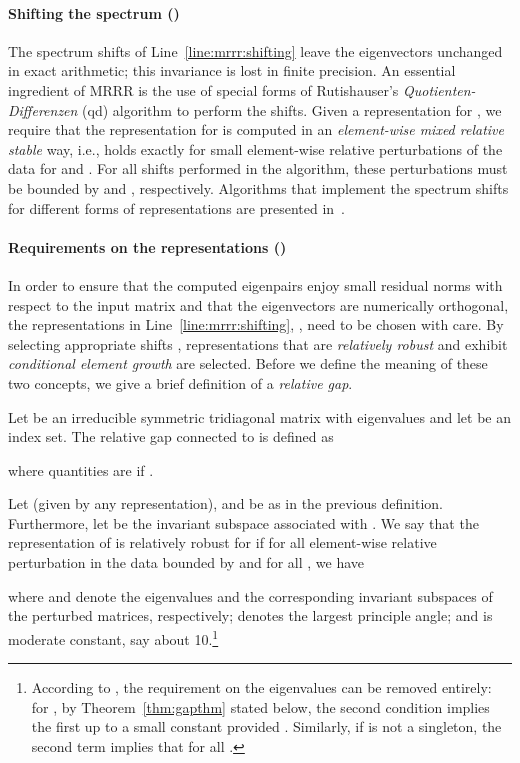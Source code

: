 \documentclass[final]{siamltex}
\begin{document}
\paragraph{Shifting the spectrum ()}
The spectrum shifts of Line~\ref{line:mrrr:shifting} leave the eigenvectors 
unchanged in exact arithmetic; this invariance is lost in finite precision. An essential
ingredient of MRRR is the use of special forms of Rutishauser's {\it
  Quotienten-Differenzen} (qd) algorithm to perform the shifts. 
Given a representation for , we require that the representation
for  is computed in an {\it element-wise mixed relative 
stable} way, i.e.,  holds
exactly for small element-wise relative perturbations of the data for
 and . For all shifts performed in the algorithm, these
perturbations must be bounded by   
 and , respectively. Algorithms that implement the spectrum
shifts for different forms of representations are presented
in~\cite{Dhillon:2004:Ortvecs,Willems:twisted,Willems:blocked}. 

\paragraph{Requirements on the representations ()}
In order to ensure that the computed eigenpairs enjoy small residual norms
with respect to the input matrix and that the eigenvectors are
numerically orthogonal, the representations in
Line~\ref{line:mrrr:shifting}, , need to be chosen
with care. By selecting appropriate shifts , representations that are
{\it relatively robust} and exhibit {\it conditional element growth} are
selected. Before we define the meaning of these two concepts, we give a
brief definition of a {\it relative gap}. 

\begin{definition} Let  be an irreducible
  symmetric tridiagonal matrix with eigenvalues  and let
   be an index set.  
  The relative gap connected to  is defined as
  
  where quantities  are  if .
\label{def:relgapindexset}
\end{definition}

\begin{definition} 
Let  (given by any representation),  and  be as
in the previous definition. Furthermore, let  be
the invariant subspace associated with . We say 
  that the representation of  is relatively robust for 
  if for all element-wise relative perturbation in the data bounded by
   and for all , we have 
  
where  and  denote the
eigenvalues and the corresponding invariant subspaces of the perturbed matrices,
respectively; 
denotes the largest principle angle; 
and  is moderate constant, say about 10.\footnote{According to
  \cite{Willems:Diss,Willems:framework}, the requirement on the eigenvalues
  can be removed entirely: for , by
  Theorem~\ref{thm:gapthm} stated below, the second condition implies 
  the first up to a small constant provided .  Similarly, if  is not a
  singleton, the second term implies that  for all . 
}
\label{def:RRR}
\end{definition}
\end{document}
